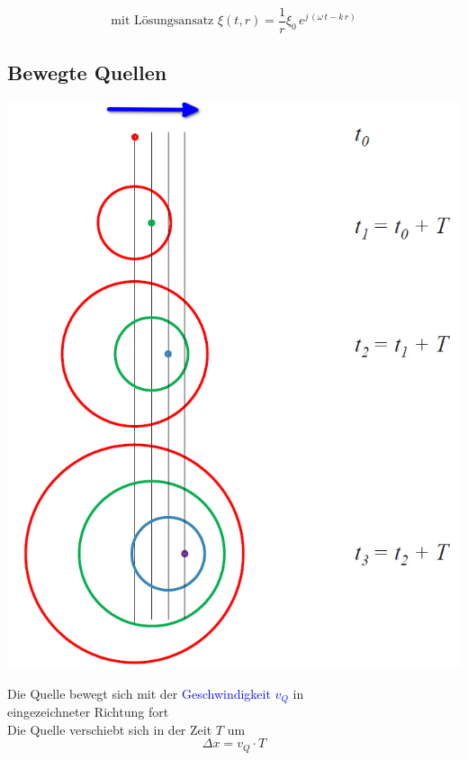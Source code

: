 $$ \boxed{  \text{mit Lösungsansatz } \xi(t, r) = \frac{1}{r} \xi_0 \, e^{j \, (\omega \, t - k \, r)} }  $$





\subsection{Bewegte Quellen}

\begin{minipage}{0.48\linewidth}
\includegraphics[width=0.98\linewidth]{Bilder/Wellen-Optik/Bewegte_Quellen}
\end{minipage}
\hfill
\begin{minipage}{0.48\linewidth}
Die Quelle bewegt sich mit der \textcolor{blue}{Geschwindigkeit $v_Q$} in \\ eingezeichneter Richtung fort\\

Die Quelle verschiebt sich in der Zeit $T$ um 
$$ \boxed{ \Delta x = v_Q \cdot T }$$
\end{minipage}

